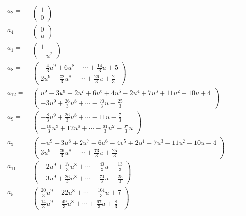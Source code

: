 \documentclass[1p]{elsarticle_modified}
\theoremstyle{definition}
\begin{document}
\begin{tabular}{m{7pt} m{180pt} m{7pt} m{180pt} }
\flushright $a_{2}=$&$\begin{pmatrix}1\\0\end{pmatrix}$ \\
\flushright $a_{4}=$&$\begin{pmatrix}0\\u\end{pmatrix}$ \\
\flushright $a_{1}=$&$\begin{pmatrix}1\\- u^2\end{pmatrix}$ \\
\flushright $a_{8}=$&$\begin{pmatrix}-\frac{4}{3} u^9+6 u^8+\cdots+\frac{14}{3} u+5\\2 u^9-\frac{22}{3} u^8+\cdots+\frac{26}{3} u+\frac{2}{3}\end{pmatrix}$ \\
\flushright $a_{12}=$&$\begin{pmatrix}u^9-3 u^8-2 u^7+6 u^6+4 u^5-2 u^4+7 u^3+11 u^2+10 u+4\\-3 u^9+\frac{26}{3} u^8+\cdots-\frac{70}{3} u-\frac{25}{3}\end{pmatrix}$ \\
\flushright $a_{9}=$&$\begin{pmatrix}-\frac{8}{3} u^9+\frac{26}{3} u^8+\cdots-11 u-\frac{7}{3}\\-\frac{10}{3} u^9+12 u^8+\cdots-\frac{61}{3} u^2-\frac{37}{3} u\end{pmatrix}$ \\
\flushright $a_{3}=$&$\begin{pmatrix}- u^9+3 u^8+2 u^7-6 u^6-4 u^5+2 u^4-7 u^3-11 u^2-10 u-4\\3 u^9-\frac{26}{3} u^8+\cdots+\frac{73}{3} u+\frac{25}{3}\end{pmatrix}$ \\
\flushright $a_{11}=$&$\begin{pmatrix}-2 u^9+\frac{17}{3} u^8+\cdots-\frac{40}{3} u-\frac{13}{3}\\-3 u^9+\frac{26}{3} u^8+\cdots-\frac{70}{3} u-\frac{25}{3}\end{pmatrix}$ \\
\flushright $a_{5}=$&$\begin{pmatrix}\frac{20}{3} u^9-22 u^8+\cdots+\frac{104}{3} u+7\\\frac{14}{3} u^9-\frac{49}{3} u^8+\cdots+\frac{67}{3} u+\frac{8}{3}\end{pmatrix}$ \\

\end{tabular}
\end{document}
